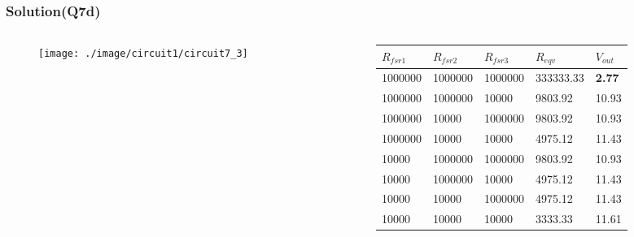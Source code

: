 \documentclass{beamer}
\begin{document}

\begin{frame}
\frametitle{Solution(Q7d)}

\begin{columns}
\begin{column}{3cm}
\begin{figure}[H]
  \centering
  \texttt{[image: ./image/circuit1/circuit7\_3]}
\end{figure}
\end{column}

\begin{column}{8cm}

\begin{table}
\begin{tabular}{l l l l l}
\toprule
\textbf{$R_{fsr1}$} & \textbf{$R_{fsr2}$} & \textbf{$R_{fsr3}$} & \textbf{$R_{eqv}$} & \textbf{$V_{out}$}\\
\midrule
1000000   & 1000000   & 1000000 & 333333.33   & {\bf 2.77}  \\
1000000   & 1000000   & 10000   & 9803.92     & 10.93 \\
1000000   & 10000     & 1000000 & 9803.92     & 10.93 \\
1000000   & 10000     & 10000   & 4975.12     & 11.43 \\
10000     & 1000000   & 1000000 & 9803.92     & 10.93 \\
10000     & 1000000   & 10000   & 4975.12     & 11.43 \\
10000     & 10000     & 1000000 & 4975.12     & 11.43 \\
10000     & 10000     & 10000   & 3333.33     & 11.61 \\
\bottomrule
\end{tabular}

\end{table}
\end{column}



\end{columns}

\end{frame}


\end{document}
